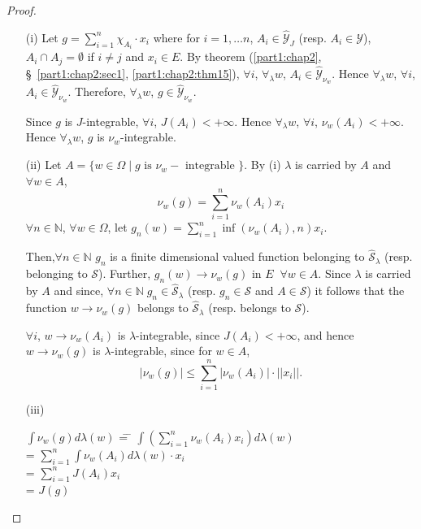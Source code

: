 \begin{proof}
\begin{itemize}
\item[{\rm (i)}] Let $g = \sum\limits^n_{i=1} \chi_{A_i} \cdot x_i$
  where for $i = 1, \ldots n$, $A_i \in \hat{\mathscr{Y}}_J$
  (resp. $A_i \in \mathscr{Y}$), $A_i \cap A_j = \emptyset$ if $ i
  \neq j$ and $x_i \in E$. By theorem (\ref{part1:chap2},
  \S\ \ref{part1:chap2:sec1}, \ref{part1:chap2:thm15}), $\forall i$, 
  $\forall_\lambda w$, $A_i \in \hat{\mathscr{Y}}_{\nu_w}$. Hence
  $\forall_\lambda w$, $\forall i$, $A_i \in
  \hat{\mathscr{Y}}_{\nu_w}$. Therefore, $\forall_\lambda w$, $g
  \in\hat{\mathscr{Y}}_{\nu_w}$.  

 Since $g$ is $J$-integrable, $\forall i$, $J(A_i)< +
  \infty$. Hence $\forall_\lambda w$, $\forall i$,
  $\nu_w(A_i)<+\infty$. Hence $\forall_\lambda w$, $g$ is
  $\nu_w$-integrable. 

\item[{\rm (ii)}] Let $A = \{ w \in \Omega \mid g  \text{ is }
  \nu_w - \text{ integrable }  \}$.  By (i) $\lambda$ is carried by $A$
  and $\forall w \in A$,
$$
\nu_w (g) = \sum\limits^n_{i=1} \nu_w (A_i) x_i
$$ 
$\forall n \in \mathbb{N}$, $\forall w \in \Omega$, let $g_n(w) =
\sum\limits^n_{i=1} \inf (\nu_w (A_i), n) x_i$. 

Then,\pageoriginale $\forall n \in \mathbb{N}$ $g_n$  is a finite
dimensional valued function belonging to $\hat{\mathcal{S}}_\lambda$
(resp. belonging to $\mathcal{S}$). Further, $g_n(w) \to \nu_w(g)$ in
$E \;\; \forall w \in A$. Since $\lambda$ is carried by $A$ and since,
$\forall n \in \mathbb{N} \; g_n \in\hat{\mathcal{S}}_\lambda$
(resp. $g_n \in \mathcal{S}$ and $A \in\mathcal{S}$) it follows that
the function $w \to \nu_w (g)$ belongs to $\hat{\mathcal{S}}_\lambda$
(resp. belongs to $\mathcal{S}$). 

$\forall i$, $w \to \nu_w (A_i)$ is $\lambda$-integrable, since
$J(A_i) < + \infty$, and hence $w \to \nu_w (g)$ is
$\lambda$-integrable, since for $w \in A$, 
$$
|\nu_w(g)| \leq \sum\limits^n_{i=1} | \nu_w (A_i) | \cdot || x_i ||. 
$$


\item[{\rm (iii)}] 
\begin{tabbing}
$\int \nu_w (g) d \lambda (w)$ \= = \=  $\int (\sum\limits^n_{i=1} \nu_w (A_i)
x_i) d \lambda(w)$\\
\> = \> $\sum\limits^n_{i=1} \int \nu_w(A_i) d \lambda (w) \cdot x_i$\\
\> = \> $\sum\limits^n_{i=1} J(A_i) x_i$ \\
\> = \> $J(g)$
\end{tabbing}
\end{itemize}
\end{proof}

